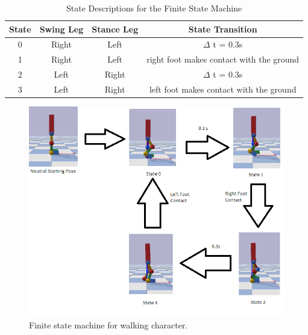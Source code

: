 \documentclass[12pt, a4paper]{article}
\begin{document}
\begin{table}[ht]
\caption{State Descriptions for the Finite State Machine}
\begin{center}
\begin{tabular}{|c|c|c|c|}
\hline
State& Swing Leg & Stance Leg& State Transition\\
\hline 
0& Right & Left&  $\Delta$ t = 0.3s\\
\hline
1 &  Right& Left & right foot makes contact with the ground\\
\hline
2 &  Left & Right & $\Delta$ t = 0.3s\\
\hline
3 & Left& Right& left foot makes contact with the ground\\
\hline
\end{tabular}
\end{center}
\label{tbl:state descriptions}
\end{table}

  
\begin{figure}
\begin{center}
\includegraphics[scale=0.8]{finite_state}
\caption{Finite state machine for walking character.}
\label{fig: finite state}
\end{center}
\end{figure}
\end{document}
